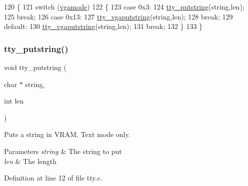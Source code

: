 \begin{DoxyCode}
120                                             \{
121     \textcolor{keywordflow}{switch} (\hyperlink{a00173_af93b0649fdd1bea5b6d29ed37205aa2c_af93b0649fdd1bea5b6d29ed37205aa2c}{vgamode})
122     \{
123     \textcolor{keywordflow}{case} 0x3:
124         \hyperlink{a00173_a5b5bf610a57f3c59b2851fa2652081ec_a5b5bf610a57f3c59b2851fa2652081ec}{tty\_putstring}(\textcolor{keywordtype}{string},len);
125         \textcolor{keywordflow}{break};
126     \textcolor{keywordflow}{case} 0x13:
127         \hyperlink{a00173_a05ca3f5e64f38fec173b635ca8465415_a05ca3f5e64f38fec173b635ca8465415}{tty\_vgaputstring}(\textcolor{keywordtype}{string},len);
128         \textcolor{keywordflow}{break};
129     \textcolor{keywordflow}{default}:
130         \hyperlink{a00173_a05ca3f5e64f38fec173b635ca8465415_a05ca3f5e64f38fec173b635ca8465415}{tty\_vgaputstring}(\textcolor{keywordtype}{string},len);
131         \textcolor{keywordflow}{break};
132     \}
133 \}
\end{DoxyCode}
\mbox{\label{a00176_a5b5bf610a57f3c59b2851fa2652081ec_a5b5bf610a57f3c59b2851fa2652081ec}} 
\subsubsection{\texorpdfstring{tty\+\_\+putstring()}{tty\_putstring()}}
{\footnotesize\ttfamily void tty\+\_\+putstring (\begin{DoxyParamCaption}\item[{char $\ast$}]{string,  }\item[{int}]{len }\end{DoxyParamCaption})}



Puts a string in V\+R\+AM, Text mode only. 


\begin{DoxyParams}{Parameters}
{\em string} & The string to put \\
\hline
{\em len} & The length \\
\hline
\end{DoxyParams}


Definition at line 12 of file tty.\+c.


